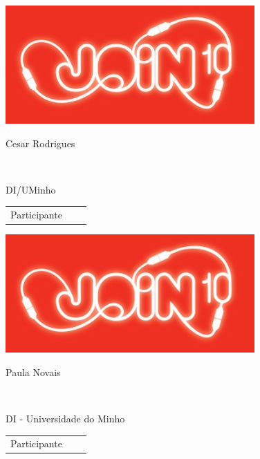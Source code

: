 \documentclass[twocolumn]{article}
\begin{document}
  \vspace{12.5mm} 
 \begin{minipage}{89mm} 
 \includegraphics{design/logo}\\ 
 
 \addvspace{5mm} 
 
 \begin{center} 
 \huge{Cesar Rodrigues} 
 \scriptsize{ 
 \begin{tabular*}{0.75\textwidth}{c} 
 \hline 
 \end{tabular*}}\\ 
DI/UMinho
 \end{center} 
 
 \begin{flushright} 
 \begin{tabular}{r l l} 
 \normalsize{Participante} & & 
 \end{tabular} 
 \end{flushright} 
 \end{minipage} 
 
  
 \vspace{13mm} 
 \begin{minipage}{89mm} 
 \includegraphics{design/logo}\\ 
 
 \addvspace{5mm} 
 
 \begin{center} 
 \huge{Paula Novais} 
 \scriptsize{ 
 \begin{tabular*}{0.75\textwidth}{c} 
 \hline 
 \end{tabular*}}\\ 
DI - Universidade do Minho
 \end{center} 
 
 \begin{flushright} 
 \begin{tabular}{r l l} 
 \normalsize{Participante} & & 
 \end{tabular} 
 \end{flushright} 
 \end{minipage} 
 
\end{document}
